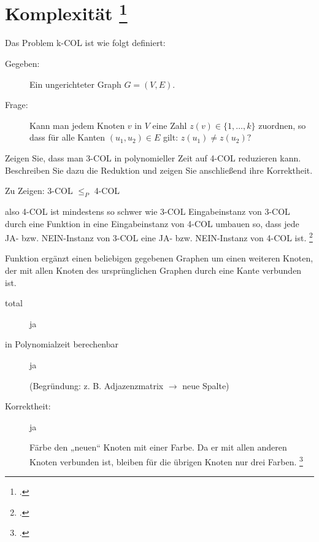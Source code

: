 \documentclass{lehramt-informatik-aufgabe}
\begin{document}
\section{Komplexität
\footcite{66115:2016:03}}

Das Problem k-COL ist wie folgt definiert:

\begin{description}
\item[Gegeben:]

Ein ungerichteter Graph $G = (V, E)$.

\item[Frage:]

Kann man jedem Knoten $v$ in $V$ eine Zahl $z(v) \in \{1, \dots ,k\}$
zuordnen, so dass für alle Kanten $(u_1,u_2) \in E$ gilt: $z(u_1) \neq
z(u_2)?$
\end{description}

Zeigen Sie, dass man 3-COL in polynomieller Zeit auf 4-COL reduzieren
kann. Beschreiben Sie dazu die Reduktion und zeigen Sie anschließend
ihre Korrektheit.

\begin{liAntwort}
Zu Zeigen: 3-COL $\leq_P$ 4-COL

also 4-COL ist mindestens so schwer wie 3-COL Eingabeinstanz von 3-COL
durch eine Funktion in eine Eingabeinstanz von 4-COL umbauen so, dass
jede JA- bzw. NEIN-Instanz von 3-COL eine JA- bzw. NEIN-Instanz von
4-COL ist.
\footcite[Seite 67]{theo:fs:4}

Funktion ergänzt einen beliebigen gegebenen Graphen um einen
weiteren Knoten, der mit allen Knoten des ursprünglichen Graphen
durch eine Kante verbunden ist.

\begin{description}
\item[total] ja

\item[in Polynomialzeit berechenbar] ja

(Begründung: z. B. Adjazenzmatrix $\rightarrow$ neue Spalte)

\item[Korrektheit:] ja

Färbe den „neuen“ Knoten mit einer Farbe. Da er mit allen anderen Knoten
verbunden ist, bleiben für die übrigen Knoten nur drei Farben.
\footcite[Seite 69]{theo:fs:4}
\end{description}
\end{liAntwort}
\end{document}
